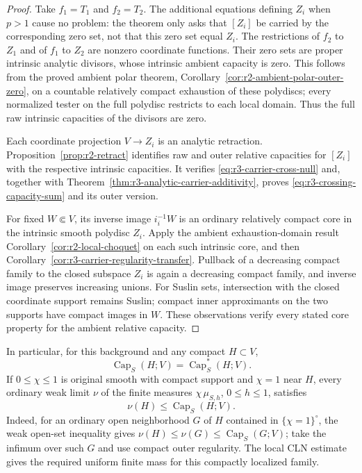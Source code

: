 \documentclass[11pt,a4paper]{article}
\numberwithin{equation}{section}
\theoremstyle{definition}
\theoremstyle{remark}
\begin{document}
\begin{proof}
Take $f_1=T_1$ and $f_2=T_2$.  The additional equations defining
$Z_i$ when $p>1$ cause no problem: the theorem only asks that
$[Z_i]$ be carried by the corresponding zero set, not that this
zero set equal $Z_i$.  The restrictions of $f_2$ to $Z_1$ and of
$f_1$ to $Z_2$ are nonzero coordinate functions.  Their zero sets
are proper intrinsic analytic divisors, whose intrinsic ambient
capacity is zero.  This follows from the proved ambient polar
theorem, Corollary~\ref{cor:r2-ambient-polar-outer-zero}, on a
countable relatively compact exhaustion of these polydiscs; every
normalized tester on the full polydisc restricts to each local
domain.  Thus the full raw intrinsic capacities of the divisors
are zero.

Each coordinate projection $V\to Z_i$ is an analytic retraction.
Proposition~\ref{prop:r2-retract} identifies raw and outer relative
capacities for $[Z_i]$ with the respective intrinsic capacities.
It verifies \eqref{eq:r3-carrier-cross-null} and, together with
Theorem~\ref{thm:r3-analytic-carrier-additivity}, proves
\eqref{eq:r3-crossing-capacity-sum} and its outer version.

For fixed $W\Subset V$, its inverse image $i_i^{-1}W$ is an ordinary
relatively compact core in the intrinsic smooth polydisc $Z_i$.
Apply the ambient exhaustion-domain result
Corollary~\ref{cor:r2-local-choquet} on each such intrinsic core,
and then Corollary~\ref{cor:r3-carrier-regularity-transfer}.
Pullback of a decreasing compact family to the closed subspace
$Z_i$ is again a decreasing compact family, and inverse image
preserves increasing unions.  For Suslin sets, intersection with
the closed coordinate support remains Suslin; compact inner
approximants on the two supports have compact images in $W$.
These observations verify every stated core property for the
ambient relative capacity.
\end{proof}

In particular, for this background and any compact $H\subset V$,
\[
 \operatorname{Cap}_S(H;V)=\operatorname{Cap}_S^*(H;V).
\]
If $0\leq\chi\leq1$ is original smooth with compact support and
$\chi=1$ near $H$, every ordinary weak limit $\nu$ of the finite
measures $\chi\,\mu_{S,h}$, $0\leq h\leq1$, satisfies
\[
 \nu(H)\leq\operatorname{Cap}_S(H;V).
\]
Indeed, for an ordinary open neighborhood $G$ of $H$ contained in
$\{\chi=1\}^{\circ}$, the weak open-set inequality gives
$\nu(H)\leq\nu(G)\leq\operatorname{Cap}_S(G;V)$; take the
infimum over such $G$ and use compact outer regularity.  The
local CLN estimate gives the required uniform finite mass for this
compactly localized family.
\end{document}
